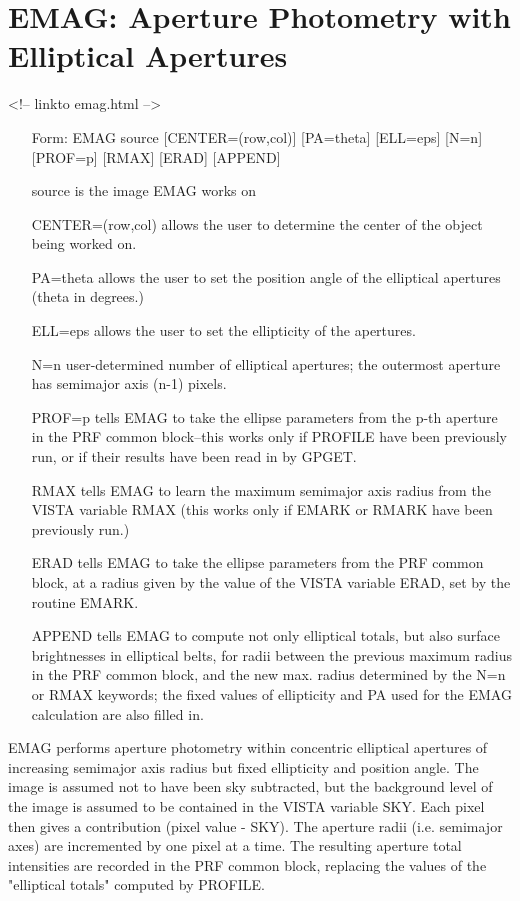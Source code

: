 \section{EMAG: Aperture Photometry with Elliptical Apertures}
\begin{rawhtml}
<!-- linkto emag.html -->
\end{rawhtml}
\begin{itemize}
  \item[Form: EMAG source {[CENTER=(row,col)]} {[PA=theta]} {[ELL=eps]} {[N=n]}
     {[PROF=p]} {[RMAX]} {[ERAD]} {[APPEND]}\hfill]{}
  \item[source]{is the image EMAG works on}
  \item[CENTER=(row,col)]{allows the user to determine the center
       of the object being worked on.}
  \item[PA=theta]{allows the user to set the position angle of
       the elliptical apertures (theta in degrees.)}
  \item[ELL=eps]{allows the user to set the ellipticity of the
       apertures.}
  \item[N=n]{user-determined number of elliptical apertures;
       the outermost aperture has semimajor axis (n-1) pixels.}
  \item[PROF=p]{tells EMAG to take the ellipse parameters from the p-th
       aperture in the PRF common block--this works only if PROFILE have
       been previously run, or if their results have been read in by
       GPGET.}
  \item[RMAX]{tells EMAG to learn the maximum semimajor axis radius from
       the VISTA variable RMAX (this works only if EMARK or RMARK have been
       previously run.)}
  \item[ERAD]{tells EMAG to take the ellipse parameters from the PRF common
       block, at a radius given by the value of the VISTA variable ERAD,
       set by the routine EMARK.}
  \item[APPEND]{tells EMAG to compute not only elliptical totals, but also
       surface brightnesses in elliptical belts, for radii between the
       previous maximum radius in the PRF common block, and the new
       max. radius determined by the N=n or RMAX keywords; the fixed values
       of ellipticity and PA used for the EMAG calculation are also filled
       in.}
\end{itemize}

EMAG performs aperture photometry within concentric elliptical apertures of
increasing semimajor axis radius but fixed ellipticity and position angle.
The image is assumed not to have been sky subtracted, but the background
level of the image is assumed to be contained in the VISTA variable
SKY. Each pixel then gives a contribution (pixel value - SKY).  The
aperture radii (i.e. semimajor axes) are incremented by one pixel at a
time. The resulting aperture total intensities are recorded in the PRF
common block, replacing the values of the "elliptical totals" computed by
PROFILE.


